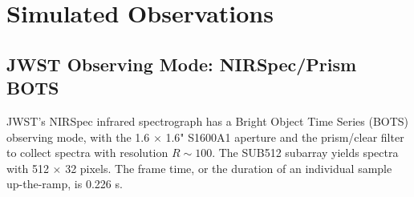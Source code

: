 

\section{Simulated Observations}

\subsection{JWST Observing Mode: NIRSpec/Prism BOTS}

JWST's NIRSpec infrared spectrograph has a Bright Object Time Series (BOTS) observing mode, with the 1.6 $\times$ 1.6" S1600A1 aperture and the prism/clear filter to collect spectra with resolution $R\sim100$. The SUB512 subarray yields spectra with 512 $\times$ 32 pixels. The frame time, or the duration of an individual sample up-the-ramp, is 0.226 s. 

